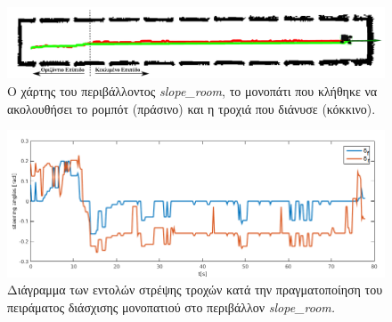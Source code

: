 \begin{figure}[!ht]
	\centering
	\includegraphics[width=\linewidth]{Chapters/Chapter5/Figures/ptc_experiments/slope_room_path_and_traj.png}
	\caption{Ο χάρτης του περιβάλλοντος \textit{slope{\_}room}, το μονοπάτι που κλήθηκε να ακολουθήσει το ρομπότ (πράσινο) και η τροχιά που διάνυσε (κόκκινο).}
	\label{fig:slope_room_path_and_traj}
\end{figure}

\begin{figure}[!ht]
	\centering
	\includegraphics[width=0.9\linewidth]{Chapters/Chapter5/Figures/ptc_experiments/plots/slope_room/fsa_rsa.png}
	\caption{Διάγραμμα των εντολών στρέψης τροχών κατά την πραγματοποίηση του πειράματος διάσχισης μονοπατιού στο περιβάλλον \textit{slope{\_}room.}}
	\label{fig:slope_room_fsa_rsa}
\end{figure}

